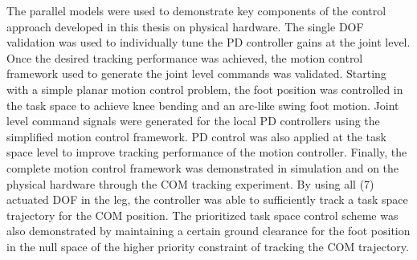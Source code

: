 The parallel models were used to demonstrate key components of the control approach developed in this thesis on physical hardware. The single DOF validation was used to individually tune the PD controller gains at the joint level. Once the desired tracking performance was achieved, the motion control framework used to generate the joint level commands was validated. Starting with a simple planar motion control problem, the foot position was controlled in the task space to achieve knee bending and an arc-like swing foot motion. Joint level command signals were generated for the local PD controllers using the simplified motion control framework. PD control was also applied at the task space level to improve tracking performance of the motion controller. Finally, the complete motion control framework was demonstrated in simulation and on the physical hardware through the COM tracking experiment. By using all (7) actuated DOF in the leg, the controller was able to sufficiently track a task space trajectory for the COM position. The prioritized task space control scheme was also demonstrated by maintaining a certain ground clearance for the foot position in the null space of the higher priority constraint of tracking the COM trajectory. 


